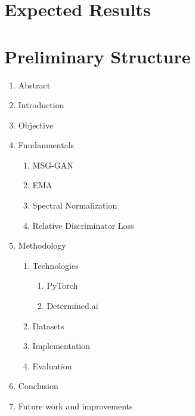 \documentclass[]{article}
\begin{document}
\noindent


\section{Expected Results}

\noindent

\newpage

\section{Preliminary Structure}

\noindent
\begin{enumerate}
  \item Abstract
  \item Introduction
  \item Objective
  \item Fundanmentals
  \begin{enumerate}
      \item MSG-GAN \cite{lee2020maskgan}
      \item EMA \cite{yazıcı2019ema}
      \item Spectral Normalization \cite{miyato2018spectral}
      \item Relative Discriminator Loss \cite{jolicoeurmartineau2018rahinge}
  \end{enumerate}
  \item Methodology
  \begin{enumerate}
    \item Technologies
    \begin{enumerate}
        \item PyTorch
        \item Determined.ai
    \end{enumerate}
    \item Datasets
    \item Implementation
    \item Evaluation
  \end{enumerate}
  \item Conclusion
  \item Future work and improvements
\end{enumerate}

\printbibliography
\end{document}
